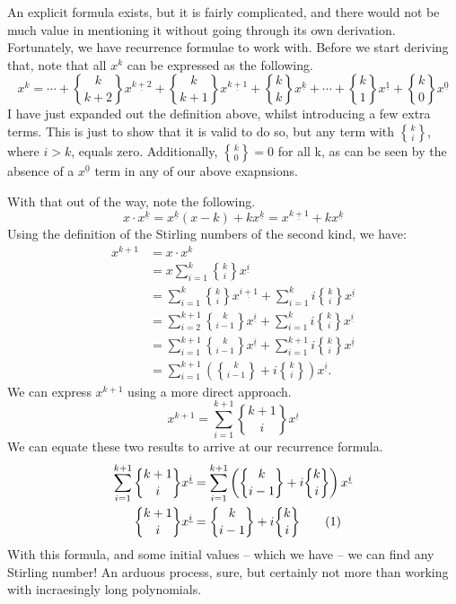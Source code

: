\documentclass[a4paper]{article}
\theoremstyle{definition}
\begin{document}
An explicit formula exists, but it is fairly complicated, and there would not be much value in mentioning it without going through its own derivation.
Fortunately, we have recurrence formulae to work with.
Before we start deriving that, note that all $x^k$ can be expressed as the following.
\begin{equation*}
    x^k = \cdots + {k\brace k+2}x^{\underline{k+2}} + {k\brace k+1}x^{\underline{k+1}} + {k\brace k}x^{\underline{k}} + \cdots + {k\brace 1}x^{\underline{1}} + {k\brace 0}x^{\underline{0}}
\end{equation*}
I have just expanded out the definition above, whilst introducing a few extra terms.
This is just to show that it is valid to do so, but any term with $k \brace i$, where $i > k$, equals zero.
Additionally, ${k \brace 0} = 0$ for all k, as can be seen by the absence of a $x^{\underline{0}}$ term in any of our above exapnsions.

With that out of the way, note the following.
\begin{equation*}
    x \cdot x^{\underline{k}} = x^{\underline{k}}(x-k) + kx^{\underline{k}} = x^{\underline{k+1}} + kx^{\underline{k}}
\end{equation*}
Using the definition of the Stirling numbers of the second kind, we have:
\begin{align*}
    x^{k+1} & =x\cdot x^k                                                                                         \\
            & = x \sum_{i=1}^{k} {k\brace i} x^{\underline{i}}                                                    \\
            & =\sum_{i=1}^{k} {k\brace i} x^{\underline{i+1}}+ \sum_{i=1}^{k} i{k\brace i} x^{\underline{i}}      \\
            & = \sum_{i=2}^{k+1} {k\brace i-1} x^{\underline{i}}+ \sum_{i=1}^{k} i{k\brace i} x^{\underline{i}}   \\
            & = \sum_{i=1}^{k+1} {k\brace i-1} x^{\underline{i}}+ \sum_{i=1}^{k+1} i{k\brace i} x^{\underline{i}} \\
            & = \sum_{i=1}^{k+1} \left({k\brace i-1} + i{k\brace i} \right)x^{\underline{i}}.
\end{align*}
We can express $x^{k+1}$ using a more direct approach.
\begin{equation*}
    x^{k+1} = \sum_{i=1}^{k+1} {{k+1}\brace {i}} x^{\underline{i}}
\end{equation*}
We can equate these two results to arrive at our recurrence formula.
\begin{align*}
    \sum_{i=1}^{k+1} {{k+1}\brace {i}} x^{\underline{i}} & = \sum_{i=1}^{k+1} \left({k\brace i-1} + i{k\brace i} \right)x^{\underline{i}} \\
    {{k+1}\brace {i}} x^{\underline{i}}                  & ={k\brace i-1} + i{k\brace i} \stepcounter{equation}\tag{\theequation}
\end{align*}
With this formula, and some initial values -- which we have -- we can find any Stirling number!
An arduous process, sure, but certainly not more than working with incraesingly long polynomials.
\end{document}
